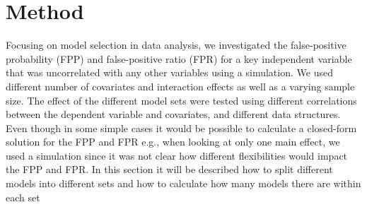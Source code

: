 
\section{Method}
Focusing on model selection in data analysis, we investigated the false-positive probability (FPP) and false-positive ratio (FPR) for a key independent variable that was uncorrelated with any other variables using a simulation. We used different number of covariates and interaction effects as well as a varying sample size. The effect of the different model sets were tested using different correlations between the dependent variable and covariates, and different data structures. Even though in some simple cases it would be possible to calculate a closed-form solution for the FPP and FPR e.g., when looking at only one main effect, we used a simulation since it was not clear how different flexibilities would impact the FPP and FPR. In this section it will be described how to split different models into different sets and how to calculate how many models there are within each set\\

